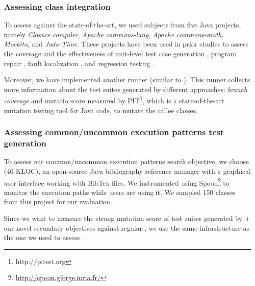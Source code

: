 \subsubsection{Assessing class integration} 
To assess \cling against the state-of-the-art, we used subjects from five Java projects, namely \textit{Closure compiler}, \textit{Apache commons-lang}, \textit{Apache commons-math}, \textit{Mockito}, and \textit{Joda-Time}. These 
projects have been used in prior studies to assess the coverage and the effectiveness of unit-level test case generation \cite{ma2015grt, Panichella2018, just2014defects4j, Shamshiri2016}, program repair \cite{smith2015cure, martinez2016astor}, fault localization \cite{pearson2017evaluating, b2016learning}, and regression testing \cite{noor2015similarity, lu2016does}.

Moreover, we have implemented another runner (similar to \exrunner). This runner collects more information about the test suites generated by different approaches: \textit{branch coverage} and mutatio score measured by PIT\footnote{http://pitest.org}, which is a state-of-the-art mutation testing tool for Java code, to mutate the callee classes.

\subsubsection{Assessing common/uncommon execution patterns test generation} 

To assess our common/uncommon execution patterns search objective, we choose \jabref (46 KLOC), an open-source Java bibliography reference manager with a graphical user interface working with BibTex files. We instrumented \jabref using Spoon\footnote{\url{http://spoon.gforge.inria.fr/}} to monitor the execution paths while users are using it. We sampled 150 classes from this project for our evaluation.

Since we want to measure the strong mutation score of test suites generated by \evosuite + our novel secondary objectives against regular \evosuite, we use the same infrastructure as the one we used to assess \cling.